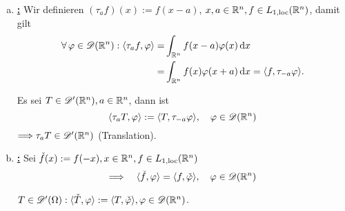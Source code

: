 \begin{bemdef}
  \label{bem:3.11}
  \begin{enumerate}[(a)]
  \item \textbf{\underline{:}} Wir definieren $(\tau_af)(x):=f(x-a)$, $x,a\in\mathbb{R}^n, f\in L_{1,\scriptsize{\textnormal{loc}}}(\mathbb{R}^n)$, damit gilt
    \begin{align*}
    \forall\, \varphi\in\mathscr{D}(\mathbb{R}^n):\langle\tau_af,\varphi\rangle=
    &\int_{\mathbb{R}^n}f(x-a)\varphi(x)\,\mathrm{d} x \\
    =&\int_{\mathbb{R}^n}f(x)\varphi(x+a)\,\mathrm{d} x=\langle f,\tau_{-a}\varphi\rangle.
    \end{align*}
    \begin{defi}
     Es sei $T\in\mathscr{D}'(\mathbb{R}^n), a\in\mathbb{R}^n$, dann ist
      \[ \langle\tau_aT,\varphi\rangle:=\langle T,\tau_{-a}\varphi\rangle,\quad\varphi\in\mathscr{D}(\mathbb{R}^n) \]
      $\Longrightarrow \tau_aT\in\mathscr{D}'(\mathbb{R}^n)$ (Translation).
    \end{defi}

  \item \textbf{\underline{:}} Sei $\check f(x):=f(-x), x\in\mathbb{R}^n, f\in L_{1,\scriptsize{\textnormal{loc}}}(\mathbb{R}^n)$
    \[ \Longrightarrow\quad\langle\check f,\varphi\rangle=\langle f,\check\varphi\rangle,\quad\varphi\in\mathscr{D}(\mathbb{R}^n) \]
    \begin{defi}
      $T\in\mathscr{D}'(\Omega): \langle\check T,\varphi\rangle:=\langle T,\check\varphi\rangle,  \varphi\in\mathscr{D}(\mathbb{R}^n)$.
    \end{defi}


\end{enumerate}
\end{bemdef}
